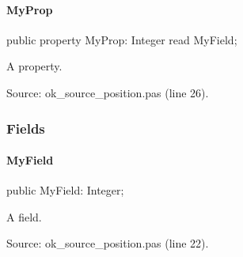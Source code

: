 \documentclass{report}
\begin{document}
\paragraph*{MyProp}\hspace*{\fill}

\begin{list}{}{
\setlength{\itemindent}{0cm}
\setlength{\listparindent}{0cm}
\setlength{\leftmargin}{\evensidemargin}
\addtolength{\leftmargin}{\tmplength}
\settowidth{\labelsep}{X}
\addtolength{\leftmargin}{\labelsep}
\setlength{\labelwidth}{\tmplength}
}
\begin{flushleft}
\item[\textbf{Declaration}\hfill]
\begin{ttfamily}
public property MyProp: Integer read MyField;\end{ttfamily}


\end{flushleft}
\par
\item[\textbf{Description}]
A property.\par
Source: ok{\_}source{\_}position.pas (line 26).

\end{list}
\subsubsection*{\large{\textbf{Fields}}\normalsize\hspace{1ex}\hfill}
\paragraph*{MyField}\hspace*{\fill}

\begin{list}{}{
\setlength{\itemindent}{0cm}
\setlength{\listparindent}{0cm}
\setlength{\leftmargin}{\evensidemargin}
\addtolength{\leftmargin}{\tmplength}
\settowidth{\labelsep}{X}
\addtolength{\leftmargin}{\labelsep}
\setlength{\labelwidth}{\tmplength}
}
\begin{flushleft}
\item[\textbf{Declaration}\hfill]
\begin{ttfamily}
public MyField: Integer;\end{ttfamily}


\end{flushleft}
\par
\item[\textbf{Description}]
A field.\par
Source: ok{\_}source{\_}position.pas (line 22).

\end{list}
\end{document}
